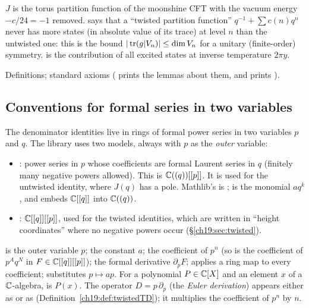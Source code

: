 \begin{physics}
$J$ is the torus partition function of the moonshine CFT with the vacuum energy $-c/24=-1$ removed.
 says that a ``twisted partition function'' $q^{-1}+\sum c(n)q^n$ never has more states (in
absolute value of its trace) at level $n$ than the untwisted one: this is the bound $|\operatorname{tr}(g|V_n)|\le\dim V_n$ for a
unitary (finite-order) symmetry.   is the contribution of all excited states at inverse temperature
$2\pi y$.
\end{physics}
\begin{status}
Definitions; standard axioms ( prints the lemmas about them,
and  prints ).
\end{status}

\subsection{Conventions for formal series in two variables}\label{ch19:sec:formalconv}

The denominator identities live in rings of formal power series in two variables $p$ and $q$.  The library uses two
models, always with $p$ as the \emph{outer} variable:
\begin{itemize}
\item {}: power series in $p$ whose coefficients are formal Laurent series in $q$
  (finitely many negative powers allowed).  This is ${\mathbb{C}}((q))[[p]]$.  It is used for the untwisted identity, where
  $J(q)$ has a pole.  Mathlib's  is ;  is
  the monomial $aq^k$, and  embeds ${\mathbb{C}}[[q]]$ into ${\mathbb{C}}((q))$.
\item {}: ${\mathbb{C}}[[q]][[p]]$, used for the twisted identities, which are written in
  ``height coordinates'' where no negative powers occur (\S\ref{ch19:sec:twisted}).
\end{itemize}
 is the outer variable $p$;  the constant $a$; 
the coefficient of $p^n$ (so  is the coefficient of $p^Aq^N$ in
$F\in{\mathbb{C}}[[q]][[p]]$);  the formal derivative $\partial_pF$; 
applies a ring map to every coefficient;  substitutes $p\mapsto ap$.  For a polynomial
$P\in{\mathbb{C}}[X]$ and an element $x$ of a ${\mathbb{C}}$-algebra,  is $P(x)$.  The operator $D=p\,\partial_p$ (the
\emph{Euler derivation}) appears either as  or as 
(Definition~\ref{ch19:def:twistedTD}); it multiplies the coefficient of $p^n$ by $n$.

